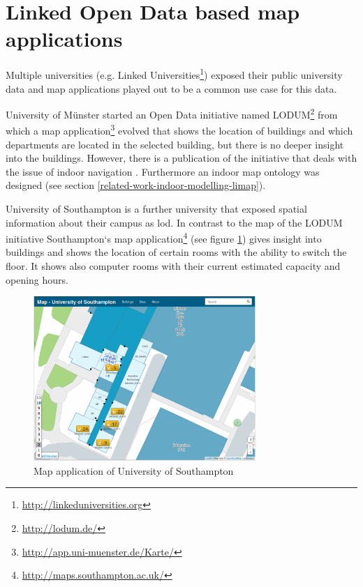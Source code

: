 \documentclass[draft,final]{vutinfth} %
\begin{document}
\section{Linked Open Data based map applications}
\label{related-work-map-app}

Multiple universities (e.g. Linked Universities\footnote{\url{http://linkeduniversities.org}}) exposed their public university data and map applications played out to be a common use case for this data.

University of Münster started an Open Data initiative named LODUM\footnote{\url{http://lodum.de/}} from which a map application\footnote{\url{http://app.uni-muenster.de/Karte/}} evolved that shows the location of buildings and which departments are located in the selected building, but there is no deeper insight into the buildings. However, there is a publication of the initiative that deals with the issue of indoor navigation \cite{kostic_automated_2015-1}. Furthermore an indoor map ontology was designed (see section \ref{related-work-indoor-modelling-limap}).

University of Southampton is a further university that exposed spatial information about their campus as \gls{lod}. In contrast to the map of the LODUM initiative Southampton`s map application\footnote{\url{http://maps.southampton.ac.uk/}} (see figure \ref{fig:related-work-map-app:southampton}) gives insight into buildings and shows the location of certain rooms with the ability to switch the floor. It shows also computer rooms with their current estimated capacity and opening hours.  

\begin{figure}[h]
    \centering
    \includegraphics[width=0.75\textwidth]{graphics/maps/southampton-map-app.png}
    \caption{Map application of University of Southampton}
    \label{fig:related-work-map-app:southampton}
\end{figure}
\end{document}
